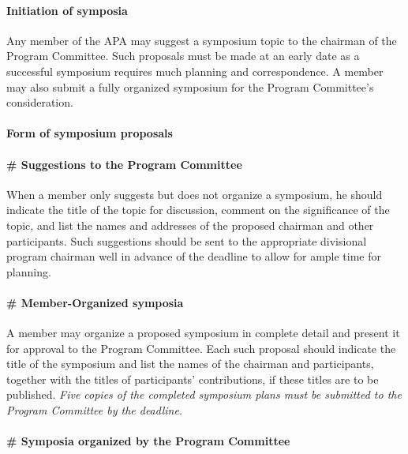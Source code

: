 \paragraph{Initiation of symposia}
\label{initiationofsymposia}

Any member of the APA may suggest a symposium topic to the chairman of the Program Committee. Such proposals must be made at an early date as a successful symposium requires much planning and correspondence. A member may also submit a fully organized symposium for the Program Committee's consideration.

\paragraph{Form of symposium proposals}
\label{formofsymposiumproposals}

\paragraph{\# Suggestions to the Program Committee}
\label{suggestionstotheprogramcommittee}

When a member only suggests but does not organize a symposium, he should indicate the title of the topic for discussion, comment on the significance of the topic, and list the names and addresses of the proposed chairman and other participants. Such suggestions should be sent to the appropriate divisional program chairman well in advance of the deadline to allow for ample time for planning.

\paragraph{\# Member-Organized symposia}
\label{member-organizedsymposia}

A member may organize a proposed symposium in complete detail and present it for approval to the Program Committee. Each such proposal should indicate the title of the symposium and list the names of the chairman and participants, together with the titles of participants' contributions, if these titles are to be published. \emph{Five copies of the completed symposium plans must be submitted to the Program Committee by the deadline.}

\paragraph{\# Symposia organized by the Program Committee}
\label{symposiaorganizedbytheprogramcommittee}

